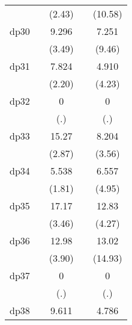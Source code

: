 {\begin{tabular}{l*{4}{c}}
            &                     &      (2.43)         &                     &     (10.58)         \\
[1em]
dp30        &                     &       9.296\sym{***}&                     &       7.251\sym{***}\\
            &                     &      (3.49)         &                     &      (9.46)         \\
[1em]
dp31        &                     &       7.824\sym{*}  &                     &       4.910\sym{***}\\
            &                     &      (2.20)         &                     &      (4.23)         \\
[1em]
dp32        &                     &           0         &                     &           0         \\
            &                     &         (.)         &                     &         (.)         \\
[1em]
dp33        &                     &       15.27\sym{**} &                     &       8.204\sym{***}\\
            &                     &      (2.87)         &                     &      (3.56)         \\
[1em]
dp34        &                     &       5.538         &                     &       6.557\sym{***}\\
            &                     &      (1.81)         &                     &      (4.95)         \\
[1em]
dp35        &                     &       17.17\sym{***}&                     &       12.83\sym{***}\\
            &                     &      (3.46)         &                     &      (4.27)         \\
[1em]
dp36        &                     &       12.98\sym{***}&                     &       13.02\sym{***}\\
            &                     &      (3.90)         &                     &     (14.93)         \\
[1em]
dp37        &                     &           0         &                     &           0         \\
            &                     &         (.)         &                     &         (.)         \\
[1em]
dp38        &                     &       9.611\sym{***}&                     &       4.786\sym{***}\\

\end{tabular}}
